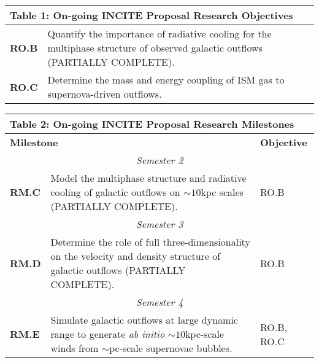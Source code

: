 \documentclass[11pt,letterpaper,english]{article}
\begin{document}
\begin{table}[h]
\vspace{-.12in}
\begin{tabular}{|l|p{6.0in}|} 
\multicolumn{2}{l}{\bf{Table 1: On-going INCITE Proposal Research Objectives}}\\
\hline
\textbf{RO.B} & Quantify the importance of radiative cooling 
for the multiphase structure of observed galactic outflows (PARTIALLY COMPLETE).\\ \hline
\textbf{RO.C} & Determine the mass and energy coupling of ISM gas to supernova-driven outflows.\\
\hline
\end{tabular}
\end{table}


\begin{table}[h]
\vspace{-.12in}
\begin{tabular}{|l|p{5.0in}|l|} 
\multicolumn{3}{l}{\bf{Table 2: On-going INCITE Proposal Research Milestones}}\\
\hline
\multicolumn{2}{|l|}{\bf Milestone} & {\bf Objective} \\ \hline
\multicolumn{3}{|c|}{\it Semester 2} \\ \hline
\textbf{RM.C} & Model the multiphase structure and radiative cooling of galactic
outflows on $\sim10$kpc scales (PARTIALLY COMPLETE). & RO.B \\ \hline
\multicolumn{3}{|c|}{\it Semester 3} \\ \hline
\textbf{RM.D} & Determine the role of full three-dimensionality on the velocity and density
structure of galactic outflows (PARTIALLY COMPLETE). & RO.B\\ \hline
\multicolumn{3}{|c|}{\it Semester 4} \\ \hline
\textbf{RM.E} & Simulate galactic outflows at large dynamic range to generate {\it ab initio} $\sim10$kpc-scale winds from $\sim$pc-scale supernovae bubbles. & RO.B, RO.C\\ 
\hline
\end{tabular}
\end{table}
\end{document}
